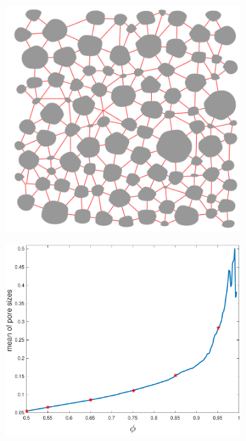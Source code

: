 \documentclass[11pt]{article}
\begin{document}
\begin{figure}
\begin{subfigure}[b]{0.33\textwidth}
  \includegraphics*[height=0.8\linewidth]{figs/triangulation_100b100.pdf}
\caption{}
\end{subfigure}
\begin{subfigure}[b]{0.33\textwidth}
  \includegraphics*[height = 0.8\linewidth]{figs/gap_mean}
\caption{}
\end{subfigure}
\begin{subfigure}[b]{0.33\textwidth}

\end{subfigure}
\end{figure}
\end{document}
